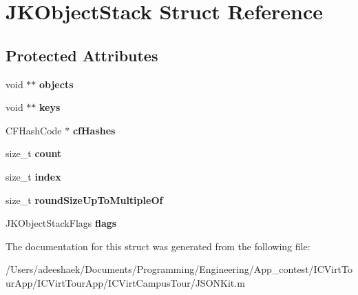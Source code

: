 \hypertarget{struct_j_k_object_stack}{\section{J\-K\-Object\-Stack Struct Reference}
\label{struct_j_k_object_stack}
}
\subsection*{Protected Attributes}
\begin{DoxyCompactItemize}
\item 
\hypertarget{struct_j_k_object_stack_a4e5bd16e37cccf94fa802f16c66d846e}{void $\ast$$\ast$ {\bfseries objects}}\label{struct_j_k_object_stack_a4e5bd16e37cccf94fa802f16c66d846e}

\item 
\hypertarget{struct_j_k_object_stack_a9f709a72d99ac0ef109d7812c004feb7}{void $\ast$$\ast$ {\bfseries keys}}\label{struct_j_k_object_stack_a9f709a72d99ac0ef109d7812c004feb7}

\item 
\hypertarget{struct_j_k_object_stack_a0281b59c0063543118ac2e21fbcb6ad9}{C\-F\-Hash\-Code $\ast$ {\bfseries cf\-Hashes}}\label{struct_j_k_object_stack_a0281b59c0063543118ac2e21fbcb6ad9}

\item 
\hypertarget{struct_j_k_object_stack_a76d971a3c552bc58ba9f0d5fceae9806}{size\-\_\-t {\bfseries count}}\label{struct_j_k_object_stack_a76d971a3c552bc58ba9f0d5fceae9806}

\item 
\hypertarget{struct_j_k_object_stack_a3f42f10d93f6edb91d7d3f6edad25921}{size\-\_\-t {\bfseries index}}\label{struct_j_k_object_stack_a3f42f10d93f6edb91d7d3f6edad25921}

\item 
\hypertarget{struct_j_k_object_stack_a931b05c6b4b87888d703d424e4595b15}{size\-\_\-t {\bfseries round\-Size\-Up\-To\-Multiple\-Of}}\label{struct_j_k_object_stack_a931b05c6b4b87888d703d424e4595b15}

\item 
\hypertarget{struct_j_k_object_stack_a16cc6c3a2706fb6407a72485a9b24b06}{J\-K\-Object\-Stack\-Flags {\bfseries flags}}\label{struct_j_k_object_stack_a16cc6c3a2706fb6407a72485a9b24b06}

\end{DoxyCompactItemize}


The documentation for this struct was generated from the following file\-:\begin{DoxyCompactItemize}
\item 
/\-Users/adeeshaek/\-Documents/\-Programming/\-Engineering/\-App\-\_\-contest/\-I\-C\-Virt\-Tour\-App/\-I\-C\-Virt\-Tour\-App/\-I\-C\-Virt\-Campus\-Tour/J\-S\-O\-N\-Kit.\-m\end{DoxyCompactItemize}

